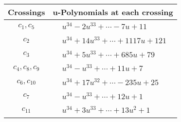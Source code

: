 \documentclass[1p]{elsarticle_modified}
\theoremstyle{definition}
\begin{document}
\begin{tabular}{m{50pt}|m{274pt}}
Crossings & \hspace{64pt}u-Polynomials at each crossing \\
\hline $$\begin{aligned}c_{1},c_{5}\end{aligned}$$&$\begin{aligned}
&u^{34}-2 u^{33}+\cdots-7 u+11
\end{aligned}$\\
\hline $$\begin{aligned}c_{2}\end{aligned}$$&$\begin{aligned}
&u^{34}+14 u^{33}+\cdots+1117 u+121
\end{aligned}$\\
\hline $$\begin{aligned}c_{3}\end{aligned}$$&$\begin{aligned}
&u^{34}+5 u^{33}+\cdots+685 u+79
\end{aligned}$\\
\hline $$\begin{aligned}c_{4},c_{8},c_{9}\end{aligned}$$&$\begin{aligned}
&u^{34}- u^{33}+\cdots+11 u+7
\end{aligned}$\\
\hline $$\begin{aligned}c_{6},c_{10}\end{aligned}$$&$\begin{aligned}
&u^{34}+17 u^{32}+\cdots-235 u+25
\end{aligned}$\\
\hline $$\begin{aligned}c_{7}\end{aligned}$$&$\begin{aligned}
&u^{34}- u^{33}+\cdots+12 u+1
\end{aligned}$\\
\hline $$\begin{aligned}c_{11}\end{aligned}$$&$\begin{aligned}
&u^{34}+3 u^{33}+\cdots+13 u^2+1
\end{aligned}$\\
\hline
\end{tabular}\\~\\
\newpage\renewcommand{\arraystretch}{1}
\end{document}
